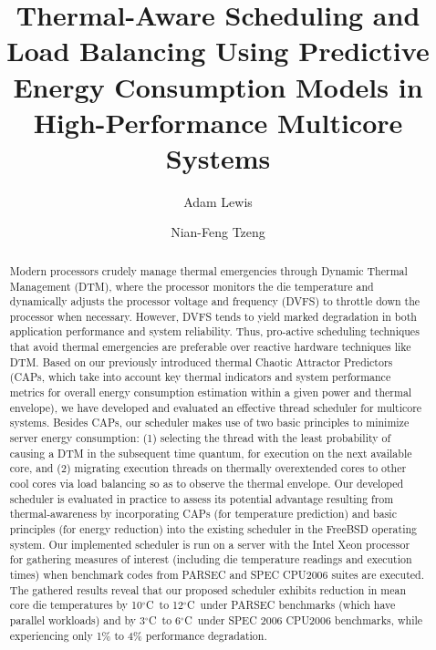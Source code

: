 \documentclass[times, 10pt,twocolumn]{IEEEtran}
\begin{document}
\title{Thermal-Aware Scheduling and Load Balancing Using Predictive
  Energy Consumption Models in High-Performance Multicore Systems} 
\author[]{Adam  Lewis} 
\author[]{Nian-Feng Tzeng} 
\maketitle
\newtheorem{defn}{Definition}
\newtheorem{thm}{Theorem}
\thispagestyle{empty}
\begin{abstract}
  Modern processors crudely manage thermal emergencies through Dynamic
  Thermal Management (DTM), where the processor monitors the die
  temperature and dynamically adjusts the processor voltage and
  frequency (DVFS) to throttle down the processor when necessary. However, DVFS tends to
  yield marked degradation in both application performance and system
  reliability. Thus, pro-active scheduling techniques that avoid thermal
  emergencies are preferable over reactive hardware techniques like
  DTM.  Based on our previously introduced thermal Chaotic Attractor Predictors
  (CAPs, which take into account key thermal indicators and system
  performance metrics for overall energy consumption estimation within a
  given power and thermal envelope), we have developed and evaluated an
  effective thread scheduler for multicore systems.  Besides CAPs, our
  scheduler makes use of two basic principles to minimize server energy
  consumption: (1) selecting the thread with the least
  probability of causing a DTM in the subsequent time quantum,
  for execution on the next available core, and (2) migrating
  execution threads on thermally overextended cores to
  other cool cores via load balancing so as to observe the thermal envelope.
  Our developed scheduler is evaluated in practice to
  assess its potential advantage resulting from thermal-awareness by
  incorporating CAPs (for temperature prediction) and basic principles
  (for energy reduction) into the existing scheduler in the FreeBSD
  operating system.   Our implemented scheduler is run on a server with
  the Intel Xeon processor for gathering measures of interest (including
  die temperature readings and execution times) when benchmark codes
  from PARSEC and SPEC CPU2006 suites are executed.  The gathered
  results reveal that our proposed scheduler exhibits reduction
  in mean core die temperatures by 10$^{\circ}$C\ to 12$^{\circ}$C\
  under PARSEC benchmarks (which have parallel workloads) and
  by 3$^{\circ}$C\ to 6$^{\circ}$C\ under SPEC 2006 CPU2006 benchmarks,
  while experiencing only 1\% to 4\% performance degradation.
\end{abstract}
\end{document}
